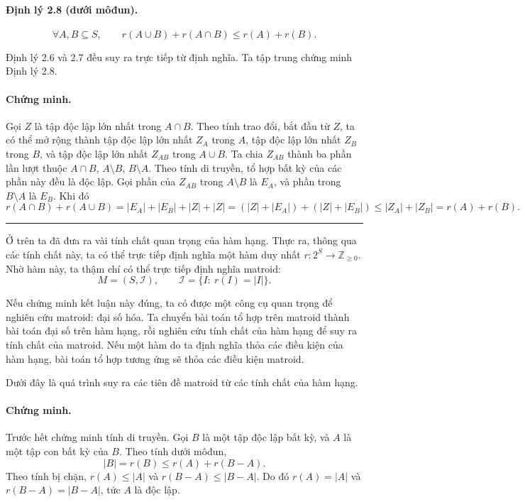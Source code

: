 \documentclass[11pt]{article}
\newcommand{\qedmark}{\hfill\rule{0.7ex}{0.7ex}}
\begin{document}
\paragraph{Định lý 2.8 (dưới môđun).}
\[
  \forall A,B\subseteq S,\qquad r(A\cup B)+r(A\cap B)\le r(A)+r(B).
\]

Định lý 2.6 và 2.7 đều suy ra trực tiếp từ định nghĩa. Ta tập trung chứng minh
Định lý 2.8.

\paragraph{Chứng minh.}
Gọi \(Z\) là tập độc lập lớn nhất trong \(A\cap B\). Theo tính trao đổi, bắt đầu
từ \(Z\), ta có thể mở rộng thành tập độc lập lớn nhất \(Z_A\) trong \(A\), tập
độc lập lớn nhất \(Z_B\) trong \(B\), và tập độc lập lớn nhất \(Z_{AB}\) trong
\(A\cup B\). Ta chia \(Z_{AB}\) thành ba phần lần lượt thuộc
\(A\cap B\), \(A\setminus B\), \(B\setminus A\). Theo tính di truyền, tổ hợp bất
kỳ của các phần này đều là độc lập. Gọi phần của \(Z_{AB}\) trong \(A\setminus
B\) là \(E_A\), và phần trong \(B\setminus A\) là \(E_B\). Khi đó
\[
  r(A\cap B)+r(A\cup B)
  = |E_A|+|E_B|+|Z|+|Z|
  = (|Z|+|E_A|)+(|Z|+|E_B|)
  \le |Z_A|+|Z_B|=r(A)+r(B).
\]
\qedmark

Ở trên ta đã đưa ra vài tính chất quan trọng của hàm hạng. Thực ra, thông qua
các tính chất này, ta có thể trực tiếp định nghĩa một hàm duy nhất
\(r:2^S\to\mathbb Z_{\ge 0}\). Nhờ hàm này, ta thậm chí có thể trực tiếp định
nghĩa matroid:
\[
  M=(S,\mathcal I),\qquad \mathcal I=\{I:\ r(I)=|I|\}.
\]

Nếu chứng minh kết luận này đúng, ta có được một công cụ quan trọng để nghiên
cứu matroid: đại số hóa. Ta chuyển bài toán tổ hợp trên matroid thành bài toán
đại số trên hàm hạng, rồi nghiên cứu tính chất của hàm hạng để suy ra tính chất
của matroid. Nếu một hàm do ta định nghĩa thỏa các điều kiện của hàm hạng, bài
toán tổ hợp tương ứng sẽ thỏa các điều kiện matroid.

Dưới đây là quá trình suy ra các tiên đề matroid từ các tính chất của hàm hạng.

\paragraph{Chứng minh.}
Trước hết chứng minh tính di truyền. Gọi \(B\) là một tập độc lập bất kỳ, và
\(A\) là một tập con bất kỳ của \(B\). Theo tính dưới môđun,
\[
  |B|=r(B)\le r(A)+r(B-A).
\]
Theo tính bị chặn, \(r(A)\le |A|\) và \(r(B-A)\le |B-A|\). Do đó
\(r(A)=|A|\) và \(r(B-A)=|B-A|\), tức \(A\) là độc lập.
\end{document}
